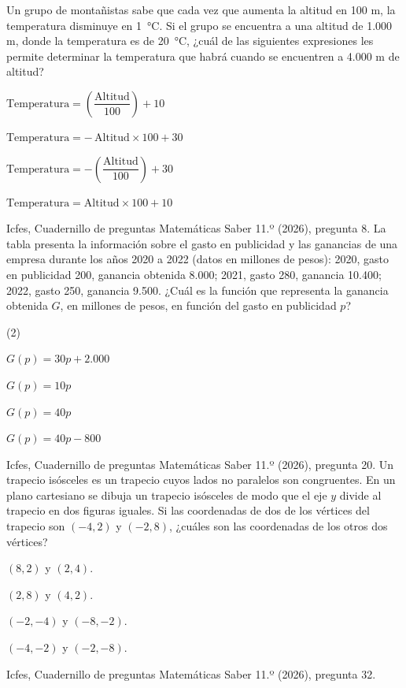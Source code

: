 \documentclass[11pt]{article}
\begin{document}
\begin{preguntas}
\pregunta Un grupo de montañistas sabe que cada vez que aumenta la altitud en
100 m, la temperatura disminuye en 1~°C. Si el grupo se encuentra a una
altitud de 1.000 m, donde la temperatura es de 20~°C, ¿cuál de las siguientes
expresiones les permite determinar la temperatura que habrá cuando se
encuentren a 4.000 m de altitud?
\begin{opciones}
  \item $\text{Temperatura} = \left(\dfrac{\text{Altitud}}{100}\right) + 10$
  \item $\text{Temperatura} = -\,\text{Altitud} \times 100 + 30$
  \item $\text{Temperatura} = -\left(\dfrac{\text{Altitud}}{100}\right) + 30$
  \item $\text{Temperatura} = \text{Altitud} \times 100 + 10$
\end{opciones}
{\small\color{mmcGris} Icfes, Cuadernillo de preguntas Matemáticas Saber 11.º
(2026), pregunta 8.}
\pregunta La tabla presenta la información sobre el gasto en publicidad y las
ganancias de una empresa durante los años 2020 a 2022 (datos en millones de
pesos): 2020, gasto en publicidad 200, ganancia obtenida 8.000; 2021, gasto
280, ganancia 10.400; 2022, gasto 250, ganancia 9.500. ¿Cuál es la función que
representa la ganancia obtenida $G$, en millones de pesos, en función del
gasto en publicidad $p$?
\begin{opciones*}(2)
  \item $G(p) = 30p + 2.000$
  \item $G(p) = 10p$
  \item $G(p) = 40p$
  \item $G(p) = 40p - 800$
\end{opciones*}
{\small\color{mmcGris} Icfes, Cuadernillo de preguntas Matemáticas Saber 11.º
(2026), pregunta 20.}
\pregunta Un trapecio isósceles es un trapecio cuyos lados no paralelos son
congruentes. En un plano cartesiano se dibuja un trapecio isósceles de modo que
el eje $y$ divide al trapecio en dos figuras iguales. Si las coordenadas de dos
de los vértices del trapecio son $(-4, 2)$ y $(-2, 8)$, ¿cuáles son las
coordenadas de los otros dos vértices?
\begin{opciones}
  \item $(8, 2)$ y $(2, 4)$.
  \item $(2, 8)$ y $(4, 2)$.
  \item $(-2, -4)$ y $(-8, -2)$.
  \item $(-4, -2)$ y $(-2, -8)$.
\end{opciones}
{\small\color{mmcGris} Icfes, Cuadernillo de preguntas Matemáticas Saber 11.º
(2026), pregunta 32.}
\end{preguntas}
\end{document}
